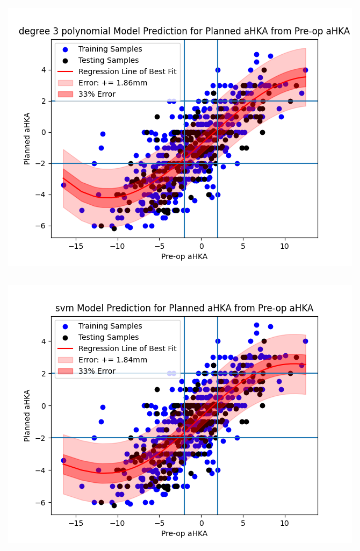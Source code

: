\documentclass{article}
\begin{document}
\begin{figure}[ht]
	\caption{Regression Models}
	\begin{subfigure}{.32\textwidth}
		\includegraphics[width=\textwidth]{degree_3_polynomial_regression.png}
		\caption{}
		\label{fig:degree_3_polynomial_regression}
	\end{subfigure}
	\begin{subfigure}{.32\textwidth}
		\includegraphics[width=\textwidth]{svm_regression.png}
		\caption{}
		\label{fig:svm_regression}
	\end{subfigure}
	\begin{subfigure}{.32\textwidth}

\end{subfigure}
\end{figure}
\end{document}
